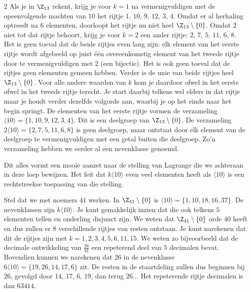 \begin{multicols}{2}
Als je in $\Z_{13}$  rekent, krijg je voor $k=1$ na vermenigvuldigen met de opeenvolgende machten van $10$ het rijtje $1$, $10$, $9$, $12$, $3$, $4$. Omdat er al herhaling optreedt na $6$ elementen, doorloopt het rijtje nu niet heel $\Z_{13}\setminus \{0\}$. Omdat $2$ niet tot dat rijtje behoort, krijg je voor $k=2$ een ander rijtje: $2$, $7$, $5$, $11$, $6$, $8$. Het is geen toeval dat de beide rijtjes even lang zijn: elk element van het eerste rijtje wordt afgebeeld op juist één overeenkomstig element van het tweede rijtje door te vermenigvuldigen met $2$ (een bijectie). Het is ook geen toeval dat de rijtjes geen elementen gemeen hebben. Verder is de unie van beide rijtjes heel $\Z_{13}\setminus \{0\}$. Voor alle andere waarden van $k$ kom je daardoor ofwel in het eerste ofwel in het tweede rijtje terecht. Je start daarbij telkens wel elders in dat rijtje maar je houdt verder dezelfde volgorde aan, waarbij je op het einde naar het begin springt. De elementen van het eerste rijtje vormen de verzameling $\langle 10\rangle =\{1,10,9,12,3,4\}$.	Dit is een deelgroep van $\Z_{13}\setminus \{0\}$. De verzameling $2\langle 10\rangle=\{2, 7, 5, 11, 6, 8\}$ is geen deelgroep, maar ontstaat door elk element van de deelgroep te vermenigvuldigen met een getal buiten die deelgroep. Zo'n verzameling hebben we eerder al een nevenklasse genoemd.

Dit alles vormt een mooie aanzet naar de stelling van Lagrange die we achteraan in deze loep bewijzen. Het feit dat $k\langle 10\rangle$ even veel elementen heeft als $\langle 10 \rangle$ is een rechtstreekse toepassing van die stelling. %
	
Stel dat we met noemers $41$ werken. In $\Z_{41}\setminus \{0\}$ is $\langle 10\rangle =\{1,10,18,16,37\}$. De nevenklassen zijn $k\langle 10\rangle$. Je kunt gemakkelijk inzien dat die ook telkens $5$ elementen tellen en onderling disjunct zijn. We weten dat $\Z_{41}\setminus \{0\}$ orde $40$ heeft en dus zullen er $8$ verschillende rijtjes van resten ontstaan. Je kunt narekenen dat dit de rijtjes zijn met $k= 1, 2, 3, 4, 5, 6, 11, 15$. We weten zo bijvoorbeeld dat de decimale ontwikkeling van $\frac{26}{41}$ een repeterend deel van $5$ decimalen bevat. Bovendien kunnen we narekenen dat $26$ in de nevenklasse $6\langle 10\rangle =\{19,26,14,17,6\}$ zit. De resten in de staartdeling zullen dus beginnen bij $26$, gevolgd door $14$, $17$, $6$, $19$, dan terug $26\ldots$ Het repeterende rijtje decimalen is dan $63414$.


\end{multicols}
